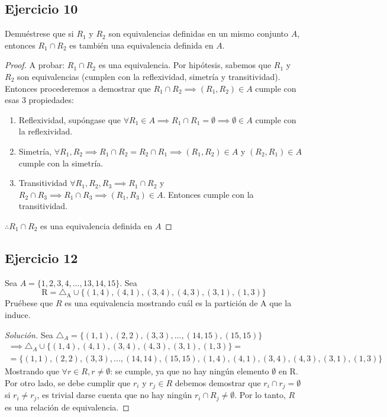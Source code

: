 \documentclass[a4paper,12pt]{article}
\newenvironment{solution}
  {\renewcommand\qedsymbol{$\blacksquare$}\begin{proof}[Solución]}
  {\end{proof}}
\begin{document}
\subsection{Ejercicio 10}
Demuéstrese que si $R_1$ y $R_2$ son equivalencias definidas en un mismo conjunto $A$, entonces $R_1 \cap R_2$ es también una equivalencia definida en $A$.
\begin{proof}
A probar: $R_1\cap R_2$ es una equivalencia. Por hipótesis, sabemos que $R_1$ y $R_2$ son equivalencias (cumplen con la reflexividad, simetría y transitividad). Entonces procederemos a demostrar que $R_1\cap R_2 \implies (R_1,R_2)\in A$ cumple con esas 3 propiedades: 
\begin{enumerate}
    \item Reflexividad, supóngase que $\forall R_1\in A\implies R_1\cap R_1= \emptyset\implies \emptyset \in A$ cumple con la reflexividad.
    \item Simetría, $\forall R_1,R_2\implies R_1\cap R_2 =R_2\cap R_1 \implies (R_1,R_2)\in A$ y $(R_2,R_1)\in A$  cumple con la simetría.
    \item Transitividad $\forall R_1,R_2,R_3\implies R_1\cap R_2$ y $R_2\cap R_3\implies R_1\cap R_3\implies (R_1,R_3)\in A$. Entonces cumple con la transitividad.
\end{enumerate}
$\therefore R_1\cap R_2$ es una equivalencia definida en $A$
\end{proof}

\subsection{Ejercicio 12}
Sea $A=\{1,2,3,4, \ldots, 13,14,15\} .$ Sea
$$
\mathrm{R}=\triangle_{\mathrm{A}}\cup\{(1,4),(4,1),(3,4),(4,3),(3,1),(1,3)\}
$$
Pruébese que $R$ es una equivalencia mostrando cuál es la partición de A que la induce.
\begin{solution}
Sea $\triangle_A=\{(1,1),(2,2),(3,3),...,(14,15),(15,15)\}$
\begin{align}
    \implies \triangle_A\cup \{(1,4),(4,1),(3,4),(4,3),(3,1),(1,3)\}=\\
    =\{(1,1),(2,2),(3,3),...,(14,14),(15,15),(1,4),(4,1),(3,4),(4,3),(3,1),(1,3)\}
\end{align}
 Mostrando que $\forall r \in R, r\neq\emptyset$: se cumple, ya que no hay ningún elemento $\emptyset$ en R.\newline\newline 
 Por otro lado, se debe cumplir que $r_i$ y $r_j\in R$ debemos demostrar que $r_i\cap r_j = \emptyset$ si $r_i\neq r_j$, es trivial darse cuenta que no hay ningún $r_i\cap R_j\neq \emptyset$. Por lo tanto, $R$ es una relación de equivalencia.
    
\end{solution}
\end{document}
